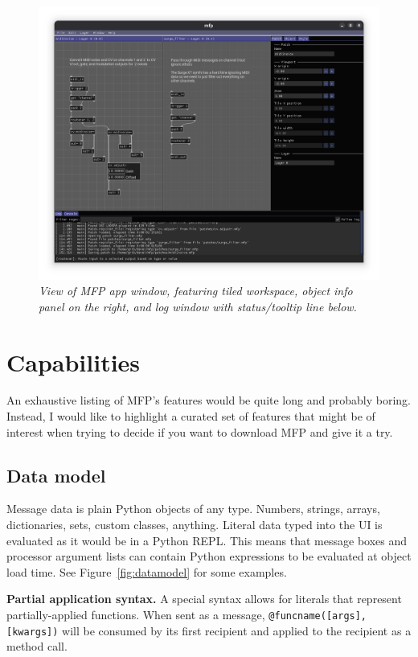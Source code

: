 \documentclass[a4paper]{article}
\begin{document}
\begin{figure}[ht]
\centerline{\includegraphics[width=6in]{appview.png}}
\caption{\label{fig:appview}{
    \it View of MFP app window, featuring tiled workspace,
    object info panel on the right, and log window with
    status/tooltip line below.
}}
\end{figure}


\section{Capabilities}

An exhaustive listing of MFP's features would be quite long and
probably boring. Instead, I would like to highlight a curated set
of features that might be of interest when trying to decide if
you want to download MFP and give it a try.

\subsection{Data model}

Message data is plain Python objects of any type. Numbers,
strings, arrays, dictionaries, sets, custom classes, anything.
Literal data typed into the UI is evaluated as it would be in a
Python REPL. This means that message boxes and processor argument
lists can contain Python expressions to be evaluated at object
load time. See Figure~\ref{fig:datamodel} for some examples.

{\bf Partial application syntax.} A special syntax allows for
literals that represent partially-applied functions. When sent as
a message, {\tt @funcname([args], [kwargs])} will be consumed by its
first recipient and applied to the recipient as a method call.
\end{document}
